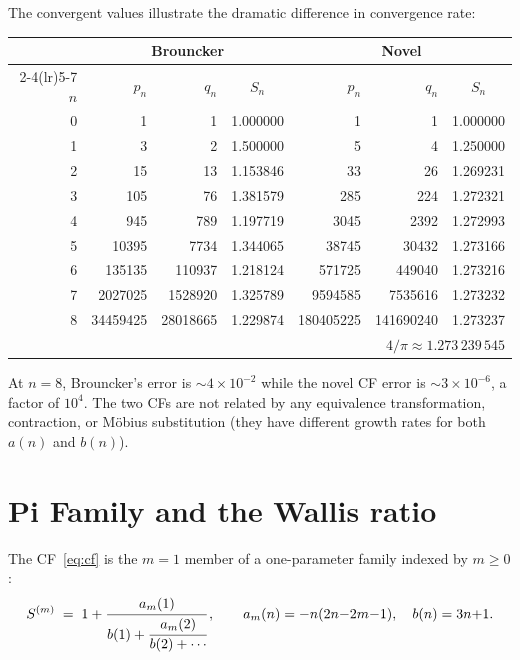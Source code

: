 \documentclass[11pt]{article}
\theoremstyle{remark}
\begin{document}
The convergent values illustrate the dramatic difference in convergence
rate:
\begin{center}
\small
\begin{tabular}{@{}rrrcrrc@{}}
  \toprule
  & \multicolumn{3}{c}{\textbf{Brouncker}} & \multicolumn{3}{c}{\textbf{Novel}} \\
  \cmidrule(lr){2-4}\cmidrule(lr){5-7}
  $n$ & $p_n$ & $q_n$ & $S_n$ & $p_n$ & $q_n$ & $S_n$ \\
  \midrule
  0 & 1 & 1 & 1.000000 & 1 & 1 & 1.000000 \\
  1 & 3 & 2 & 1.500000 & 5 & 4 & 1.250000 \\
  2 & 15 & 13 & 1.153846 & 33 & 26 & 1.269231 \\
  3 & 105 & 76 & 1.381579 & 285 & 224 & 1.272321 \\
  4 & 945 & 789 & 1.197719 & 3045 & 2392 & 1.272993 \\
  5 & 10395 & 7734 & 1.344065 & 38745 & 30432 & 1.273166 \\
  6 & 135135 & 110937 & 1.218124 & 571725 & 449040 & 1.273216 \\
  7 & 2027025 & 1528920 & 1.325789 & 9594585 & 7535616 & 1.273232 \\
  8 & 34459425 & 28018665 & 1.229874 & 180405225 & 141690240 & 1.273237 \\
  \bottomrule
  \multicolumn{7}{r}{$4/\pi \approx 1.273\,239\,545$}
\end{tabular}
\end{center}

At $n = 8$, Brouncker's error is $\sim\!4\times 10^{-2}$ while the
novel CF error is $\sim\!3\times 10^{-6}$, a factor of $10^4$.
The two CFs are not related by any equivalence transformation,
contraction, or M\"obius substitution (they have different growth
rates for both $a(n)$ and $b(n)$).


\section{Pi Family and the Wallis ratio}\label{sec:wallis}

The CF~\eqref{eq:cf} is the $m=1$ member of a one-parameter family
indexed by $m \geq 0$:
\begin{equation}\label{eq:pifamily}
  S^{(m)} \;=\; 1 + \cfrac{a_m(1)}{b(1) + \cfrac{a_m(2)}{b(2) + \cdots}}\,,
  \qquad
  a_m(n) = -n(2n{-}2m{-}1),\quad b(n) = 3n{+}1.
\end{equation}
\end{document}
